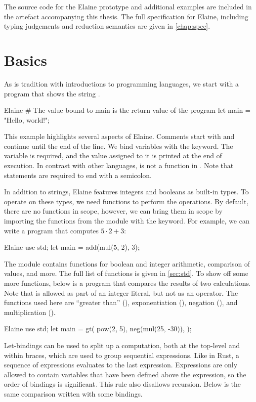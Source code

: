 The source code for the Elaine prototype and additional examples are included in the artefact accompanying this thesis. The full specification for Elaine, including typing judgements and reduction semantics are given in \cref{chap:spec}.

\section{Basics}

As is tradition with introductions to programming languages, we start with a program that shows the string .

\begin{lst}{Elaine}
# The value bound to main is the return value of the program
let main = "Hello, world!";
\end{lst}
%
This example highlights several aspects of Elaine. Comments start with \el{#} and continue until the end of the line. We bind variables with the  keyword. The  variable is required, and the value assigned to it is printed at the end of execution. In contrast with other languages,  is not a function in . Note that statements are required to end with a semicolon.

In addition to strings, Elaine features integers and booleans as built-in types. To operate on these types, we need functions to perform the operations. By default, there are no functions in scope, however, we can bring them in scope by importing the functions from the  module with the  keyword. For example, we can write a program that computes $5 \cdot 2 + 3$:

\begin{lst}{Elaine}
use std;
let main = add(mul(5, 2), 3);
\end{lst}
%
The  module contains functions for boolean and integer arithmetic, comparison of values, and more. The full list of functions is given in \cref{sec:std}. To show off some more functions, below is a program that compares the results of two calculations. Note that \el{-} is allowed as part of an integer literal, but not as an operator. The functions used here are ``greater than'' (), exponentiation (), negation (), and multiplication ().

\begin{lst}{Elaine}
use std;
let main = gt(
    pow(2, 5),
    neg(mul(25, -30)),
);
\end{lst}
%
Let-bindings can be used to split up a computation, both at the top-level and within braces, which are used to group sequential expressions. Like in Rust, a sequence of expressions evaluates to the last expression. Expressions are only allowed to contain variables that have been defined above the expression, so the order of bindings is significant. This rule also disallows recursion. Below is the same comparison written with some bindings.

